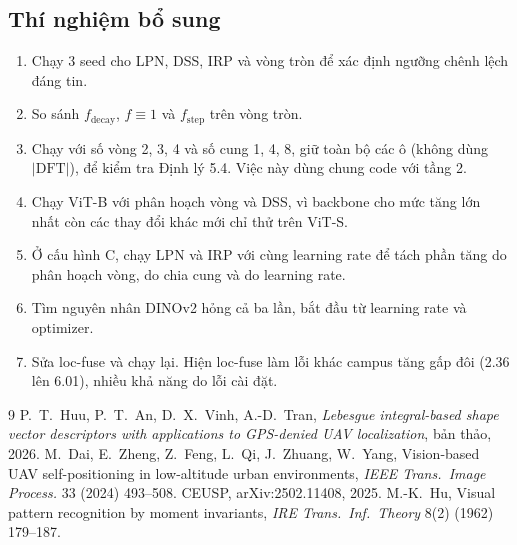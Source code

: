 \documentclass[11pt,a4paper]{article}
\begin{document}
\subsection{Thí nghiệm bổ sung}
\begin{enumerate}
\item Chạy 3 seed cho LPN, DSS, IRP và vòng tròn để xác định ngưỡng chênh lệch đáng tin.
\item So sánh $f_{\mathrm{decay}}$, $f\equiv1$ và $f_{\mathrm{step}}$ trên vòng tròn.
\item Chạy với số vòng 2, 3, 4 và số cung 1, 4, 8, giữ toàn bộ các ô (không dùng $|\mathrm{DFT}|$), để kiểm tra Định lý 5.4. Việc này dùng chung code với tầng 2.
\item Chạy ViT-B với phân hoạch vòng và DSS, vì backbone cho mức tăng lớn nhất còn các thay đổi khác mới chỉ thử trên ViT-S.
\item Ở cấu hình C, chạy LPN và IRP với cùng learning rate để tách phần tăng do phân hoạch vòng, do chia cung và do learning rate.
\item Tìm nguyên nhân DINOv2 hỏng cả ba lần, bắt đầu từ learning rate và optimizer.
\item Sửa loc-fuse và chạy lại. Hiện loc-fuse làm lỗi khác campus tăng gấp đôi (2.36 lên 6.01), nhiều khả năng do lỗi cài đặt.
\end{enumerate}

\begin{thebibliography}{9}\small
{} P.~T.~Huu, P.~T.~An, D.~X.~Vinh, A.-D.~Tran, \emph{Lebesgue integral-based shape vector descriptors with applications to GPS-denied UAV localization}, bản thảo, 2026.
 M.~Dai, E.~Zheng, Z.~Feng, L.~Qi, J.~Zhuang, W.~Yang, Vision-based UAV self-positioning in low-altitude urban environments, \emph{IEEE Trans.\ Image Process.} 33 (2024) 493--508.
 CEUSP, arXiv:2502.11408, 2025.
 M.-K.~Hu, Visual pattern recognition by moment invariants, \emph{IRE Trans.\ Inf.\ Theory} 8(2) (1962) 179--187.
\end{thebibliography}
\end{document}
